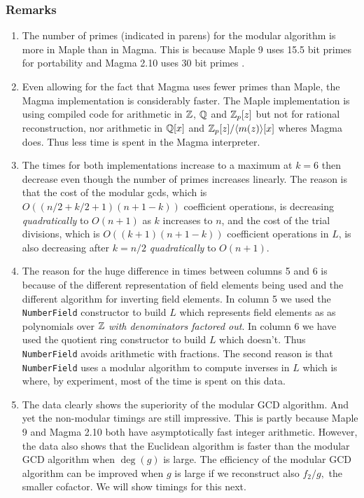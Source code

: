 \documentclass[10pt]{article}
\begin{document}
\subsubsection*{Remarks}
\begin{enumerate}
\item The number of primes (indicated in parens) for
  the modular algorithm is more in Maple than in Magma.
  This is because Maple 9 uses 15.5 bit primes for portability \cite{Disco}
  and Magma 2.10 uses 30 bit primes \cite{Steel}.

\item Even allowing for the fact that Magma uses fewer primes than
  Maple, the Magma implementation is considerably faster.
  The Maple implementation is using compiled code for arithmetic
  in ${\mathbb Z}$, ${\mathbb Q}$ and ${\mathbb Z}_p[z]$ but not for rational reconstruction,
  nor arithmetic in ${\mathbb Q}[x]$ and ${\mathbb Z}_p[z]/\langle m(z) \rangle[x]$
  wheres Magma does.  Thus less time is spent in the Magma interpreter.

\item The times for both implementations increase to a
  maximum at $k=6$ then decrease even though the number of primes
  increases linearly.  The reason is that the cost of the modular gcds,
  which is $O( (n/2+k/2+1)(n+1-k) )$ coefficient operations,
  is decreasing {\em quadratically} to $O(n+1)$ as $k$ increases to $n$,
  and the cost of the trial divisions, which is $O( (k+1)(n+1-k) )$
  coefficient operations in $L$, is also decreasing after $k=n/2$
  {\em quadratically} to $O(n+1)$.

\item The reason for the huge difference in times between columns
  5 and 6 is because of the different representation of field elements
  being used and the different algorithm for inverting field elements.
  In column 5 we used the {\tt NumberField} constructor to build $L$
  which represents field elements as as polynomials over ${\mathbb Z}$
  {\em with denominators factored out}.  In column 6 we have used
  the quotient ring constructor to build $L$ which doesn't.
  Thus {\tt NumberField} avoids arithmetic with fractions.
  The second reason is that {\tt NumberField} uses a modular
  algorithm to compute inverses in $L$ which is where, by experiment,
  most of the time is spent on this data.

\item The data clearly shows the superiority of the modular GCD algorithm.
  And yet the non-modular timings are still impressive.  This is partly because
  Maple 9 and Magma 2.10 both have asymptotically fast integer arithmetic.
However, the data also shows that the Euclidean algorithm is faster
  than the modular GCD algorithm when $\deg (g)$ is large.
  The efficiency of the modular GCD algorithm can be improved when $g$ is large
  if we reconstruct also $f_2/g,$ the smaller cofactor.
  We will show timings for this next.
\end{enumerate}
\end{document}
